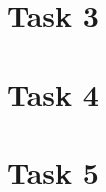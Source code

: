 \documentclass[a4paper,10pt]{article}
\begin{document}
\section*{Task 3}



\newpage
\section*{Task 4}

\newpage
\section*{Task 5}
\end{document}
